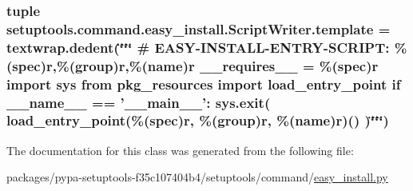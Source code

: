 \subsubsection[{template}]{\setlength{\rightskip}{0pt plus 5cm}tuple setuptools.\+command.\+easy\+\_\+install.\+Script\+Writer.\+template = textwrap.\+dedent(\char`\"{}\char`\"{}\char`\"{} \# E\+A\+S\+Y-\/I\+N\+S\+T\+A\+L\+L-\/E\+N\+T\+R\+Y-\/S\+C\+R\+I\+P\+T\+: \%(spec){\bf r},\%(group){\bf r},\%(name){\bf r} \+\_\+\+\_\+requires\+\_\+\+\_\+ = \%(spec){\bf r} import sys from pkg\+\_\+resources import load\+\_\+entry\+\_\+point {\bf if} \+\_\+\+\_\+name\+\_\+\+\_\+ == '\+\_\+\+\_\+main\+\_\+\+\_\+'\+: sys.\+exit( load\+\_\+entry\+\_\+point(\%(spec){\bf r}, \%(group){\bf r}, \%(name){\bf r})() )\char`\"{}\char`\"{}\char`\"{})\hspace{0.3cm}{\ttfamily [static]}}\label{classsetuptools_1_1command_1_1easy__install_1_1ScriptWriter_ae7705cf44f333fc94cbb325302ad165f}


The documentation for this class was generated from the following file\+:\begin{DoxyCompactItemize}
\item 
packages/pypa-\/setuptools-\/f35c107404b4/setuptools/command/\hyperlink{setuptools_2command_2easy__install_8py}{easy\+\_\+install.\+py}\end{DoxyCompactItemize}
